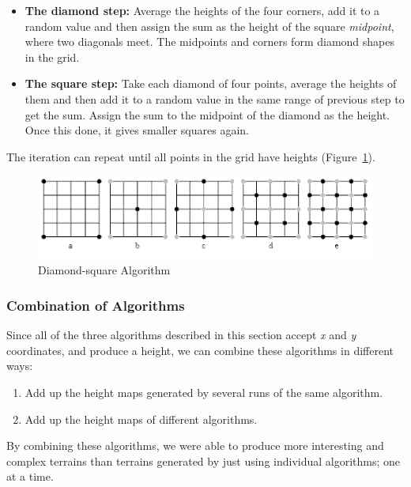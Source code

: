 \begin{itemize}
	\item \textbf{The diamond step:} Average the heights of the four corners, add it to a random value and then assign the sum as the height of the square \textit{midpoint}, where two diagonals meet. The midpoints and corners form diamond shapes in the grid.
	\item \textbf{The square step:} Take each diamond of four points, average the heights of them and then add it to a random value in the same range of previous step to get the sum. Assign the sum to the midpoint of the diamond as the height. Once this done, it gives smaller squares again.
\end{itemize}

The iteration can repeat until all points in the grid have heights (Figure~\ref{fig:dsa}).

\begin{figure}
	\center
	\includegraphics[scale=0.5]{images/dsa.png}
	\caption{Diamond-square Algorithm}
	\label{fig:dsa}
\end{figure}

\subsubsection{Combination of Algorithms}

Since all of the three algorithms described in this section accept \textit{x} and \textit{y} coordinates, and produce a height, we can combine these algorithms in different ways:

\begin{enumerate}
	\item Add up the height maps generated by several runs of the same algorithm.
	\item Add up the height maps of different algorithms.
\end{enumerate}

By combining these algorithms, we were able to produce more interesting and complex terrains than terrains generated by just using individual algorithms; one at a time.

